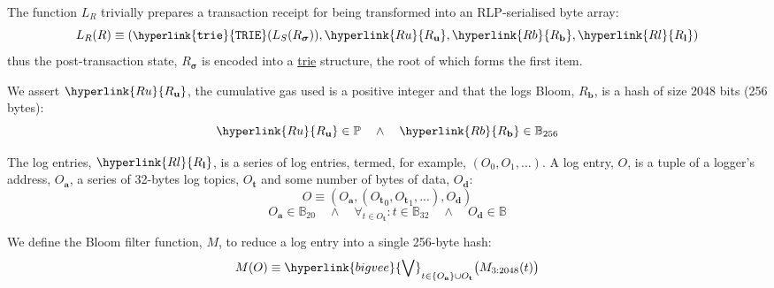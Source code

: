 \documentclass[9pt,oneside]{amsart}
\begin{document}
\begin{multicols}{2}
The function $L_R$ trivially prepares a transaction receipt for being transformed into an RLP-serialised byte array:
\begin{equation}
L_R(R) \equiv (\mathtt{\small \hyperlink{trie}{TRIE}}(L_S(R_{\boldsymbol{\sigma}})), \hyperlink{R u}{R_\mathbf{u}}, \hyperlink{R b}{R_\mathbf{b}}, \hyperlink{R l}{R_\mathbf{l}})
\end{equation}
thus the post-transaction state, $R_{\boldsymbol{\sigma}}$ is encoded into a \hyperlink{trie}{trie} structure, the root of which forms the first item.

We assert $\hyperlink{R u}{R_\mathbf{u}}$, the cumulative gas used is a positive integer and that the logs Bloom, \hyperlink{R b}{$R_\mathbf{b}$}, is a hash of size 2048 bits (256 bytes):
\begin{equation}
\hyperlink{R u}{R_\mathbf{u}} \in \mathbb{P} \quad \wedge \quad \hyperlink{R b}{R_\mathbf{b}} \in \mathbb{B}_{256}
\end{equation}


The log entries, $\hyperlink{R l}{R_\mathbf{l}}$, is a series of log entries, termed, for example, $(O_0, O_1, ...)$. A log entry, $O$, is a tuple of a logger's address, $O_\mathbf{a}$, a series of 32-bytes log topics, $O_\mathbf{t}$ and some number of bytes of data, $O_\mathbf{d}$:
\begin{equation}
O \equiv (O_\mathbf{a}, ({O_\mathbf{t}}_0, {O_\mathbf{t}}_1, ...), O_\mathbf{d})
\end{equation}
\begin{equation}
O_\mathbf{a} \in \mathbb{B}_{20} \quad \wedge \quad \forall_{t \in O_\mathbf{t}}: t \in \mathbb{B}_{32} \quad \wedge \quad O_\mathbf{d} \in \mathbb{B}
\end{equation}

We define the Bloom filter function, $M$, to reduce a log entry into a single 256-byte hash:
\begin{equation}
M(O) \equiv \hyperlink{bigvee}{\bigvee}_{t \in \{O_\mathbf{a}\} \cup O_\mathbf{t}} \big( M_{3:2048}(t) \big)
\end{equation}


\end{multicols}
\end{document}
